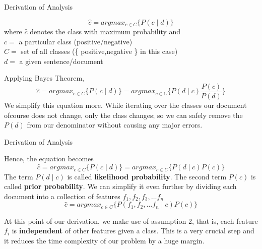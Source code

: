 \documentclass[usenames,dvipsnames]{beamer}
\begin{document}
\begin{frame}{Derivation of Analysis}
\begin{block}{}
		\begin{equation}
			\hat{c} = argmax_{c \in C} \{ P (c \mid d)\}
		\end{equation}
	where $\hat{c}$ denotes the class with maximum probability and\\
	 $c = $ a particular class (positive/negative) \\
	 $C = $ set of all classes (\{ positive,negative \} in this case) \\
	 $d = $ a given sentence/document
	 \end{block}
 \begin{block}{}
 	Applying Bayes Theorem, 
 	\begin{equation}
 			\hat{c} = argmax_{c \in C} \{ P (c \mid d)\} =  argmax_{c \in C} \{ P (d \mid c) \frac{P(c)}{P(d)}\}
 	\end{equation}
 We simplify this equation more. While iterating over the classes our document ofcourse does not change, only the class changes; so we can safely remove the $P(d)$ from our denominator without causing any major errors.
 \end{block}
\end{frame}
\begin{frame}{Derivation of Analysis}
	\begin{block}{}
		Hence, the equation becomes 
		\begin{equation}
			\hat{c} = argmax_{c \in C} \{ P (c \mid d)\} =  argmax_{c \in C} \{ P (d \mid c)P(c) \}
		\end{equation}
	The term $P(d \mid c)$ is called \textbf{likelihood probability}. The second term $P(c)$ is called \textbf{prior probability}.
	We can simplify it even further by dividing each document into a collection of features $f_{1}, f_{2}, f_{3}, \dots f_{n}$
		\begin{equation}
		\hat{c} = argmax_{c \in C} \{ P(f_{1}, f_{2}, \dots f_{n} \mid c)P(c) \}
	\end{equation}
	\end{block}
\begin{block}{}
	At this point of our derivation, we make use of assumption 2, that is, each feature $f_{i}$ is \textbf{independent} of other features given a class. This is a very crucial step and it reduces the time complexity of our problem by a huge margin. 
\end{block}
\end{frame}
\end{document}
